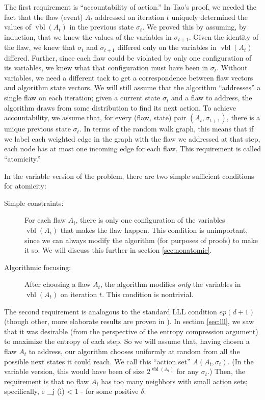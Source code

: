 \documentclass[twocolumn]{article}
\def\seqn#1\eeqn{\begin{align}#1\end{align}}
\begin{document}
The first requirement is ``accountability of action.''  In Tao's proof, we needed the fact that the flaw (event) $A_t$ addressed on iteration $t$ uniquely determined the values of $\operatorname{vbl}(A_t)$ in the previous state $\sigma_t$.  We proved this by assuming, by induction, that we knew the values of the variables in $\sigma_{t+1}$.  Given the identity of the flaw, we knew that $\sigma_t$ and $\sigma_{t+1}$ differed only on the variables in $\operatorname{vbl}(A_t)$ differed.  Further, since each flaw could be violated by only one configuration of its variables, we knew what that configuration must have been in $\sigma_t$.  Without variables, we need a different tack to get a correspondence between flaw vectors and algorithm state vectors.  We will still assume that the algorithm ``addresses'' a single flaw on each iteration; given a current state $\sigma_t$ and a flaw to address, the algorithm draws from some distribution to find its next action.  To achieve accountability, we assume that, for every (flaw, state) pair $(A_{t}, \sigma_{t+1})$, there is a unique previous state $\sigma_t$.  In terms of the random walk graph, this means that if we label each weighted edge in the graph with the flaw we addressed at that step, each node has at most one incoming edge for each flaw.  This requirement is called ``atomicity.''

In the variable version of the problem, there are two simple sufficient conditions for atomicity:
\begin{description}
  \item[Simple constraints:] For each flaw $A_i$, there is only one configuration of the variables $\operatorname{vbl}(A_i)$ that makes the flaw happen.  This condition is unimportant, since we can always modify the algorithm (for purposes of proofs) to make it so.  We will discuss this further in section \ref{sec:nonatomic}.
  \item[Algorithmic focusing:] After choosing a flaw $A_t$, the algorithm modifies \emph{only} the variables in $\operatorname{vbl}(A_t)$ on iteration $t$.  This condition is nontrivial.
\end{description}

The second requirement is analogous to the standard LLL condition $e p (d+1)$ (though other, more elaborate results are proven in \cite{achlioptas2014random}).  In section \ref{sec:lll}, we saw that it was desirable (from the perspective of the entropy compression argument) to maximize the entropy of each step.  So we will assume that, having chosen a flaw $A_t$ to address, our algorithm chooses uniformly at random from all the possible next states it could reach.  We call this ``action set'' $A(A_t, \sigma_t)$.  (In the variable version, this would have been of size $2^{\operatorname{vbl}(A_t)}$ for any $\sigma_t$.)  Then, the requirement is that no flaw $A_i$ has too many neighbors with small action sets; specifically,
\seqn
  \label{eqn:degree-req}
  e \sum_{j \in \Gamma(i)}  < 1 - \delta
\eeqn
for some positive $\delta$.
\end{document}
